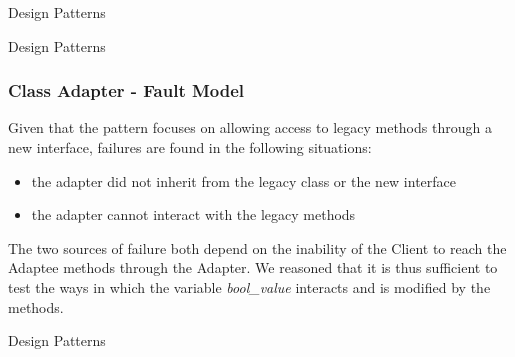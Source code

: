 \documentclass{beamer}
\begin{document}
\begin{section}{Design Patterns}
\begin{subsection}{Design Patterns}
\begin{frame}
{			\frametitle{Class Adapter - Fault Model}
Given that the pattern focuses on allowing access to legacy methods through a new interface, failures are found in the following situations:  
\begin{itemize}
	\item the adapter did not inherit from the legacy class or the new interface
	\item the adapter cannot interact with the legacy methods 
\end{itemize}
\vspace{5mm}
The two sources of failure both depend on the inability of the Client to reach the Adaptee methods through the Adapter.  We reasoned that it is thus sufficient to test the ways in which the variable \textit{bool\_value} interacts and is modified by the methods.
	}

\end{frame}
\end{subsection}

	\begin{subsection}{Design Patterns}
		\begin{frame}
			

\end{frame}
\end{subsection}
\end{section}
\end{document}
